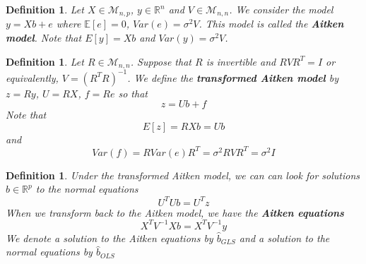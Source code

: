\documentclass[12pt]{amsart}
\newtheorem{defn}[thm]{Definition}
\newcommand{\sig}{\sigma}
\newcommand{\E}{\mathbb{E}}
\newcommand{\R}{\mathbb{R}}
\newcommand{\MM}{\mathcal{M}}
\begin{document}
\begin{defn}
Let $X \in \MM_{n,p}$, $y \in \R^n$ and $V \in \MM_{n,n}$. We consider the model $y = Xb + e$ where $\E[e] = 0$, $Var(e) = \sig^2V$. This model is called the \textbf{Aitken model}. Note that $E[y] = Xb$ and $Var(y) = \sig^2 V$.
\end{defn}

\begin{defn}
Let $R \in \MM_{n,n}$. Suppose that $R$ is invertible and $RVR^T = I$ or equivalently, $V = (R^TR)^{-1}$. We define the \textbf{transformed Aitken model} by $z = Ry$, $U = RX$, $f = Re$ so that $$z = Ub + f$$ Note that $$E[z] = RXb = Ub$$ and $$Var(f) = RVar(e)R^T = \sig^2RVR^T = \sig^2I$$ 
\end{defn}

\begin{defn}
Under the transformed Aitken model, we can can look for solutions $b \in \R^p$ to the normal equations $$U^TUb = U^Tz$$ When we transform back to the Aitken model, we have the \textbf{Aitken equations} $$X^TV^{-1}Xb = X^TV^{-1}y$$ We denote a solution to the Aitken equations by $\hat{b}_{GLS}$ and a solution to the normal equations by $\hat{b}_{OLS}$
\end{defn}
\end{document}
